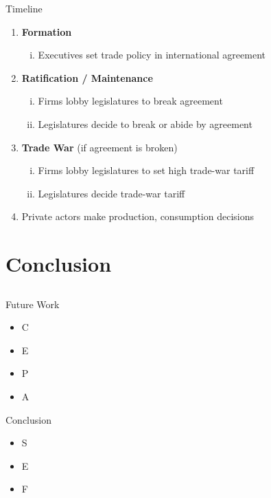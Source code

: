 \documentclass[handout]{beamer}
\begin{document}
\begin{frame}{Timeline}
\begin{enumerate}
	\item {\color{gray} \textbf{Formation}}
		\begin{enumerate}[i.]
			\item {\color{gray} Executives set trade policy in international agreement}
		\end{enumerate}
	\item \textbf{Ratification / Maintenance}
		\begin{enumerate}[i.]
			\item Firms lobby legislatures to break agreement
			\item {\color{gray} Legislatures decide to break or abide by agreement}
		\end{enumerate}
	\item {\color{gray} \textbf{Trade War} (if agreement is broken)}
		\begin{enumerate}[i.]
			\item {\color{gray} Firms lobby legislatures to set high trade-war tariff}
			\item {\color{gray} Legislatures decide trade-war tariff}
		\end{enumerate}
	\item {\color{gray} Private actors make production, consumption decisions}
\end{enumerate}
\end{frame}




\section{Conclusion}
\subsection{}
\begin{frame}{Future Work}
\begin{itemize}[<+->]
	\item C
	\item E
	\item P
	\item A
\end{itemize}
\end{frame}


\begin{frame}{Conclusion}
\begin{itemize}[<+->]
	\item S
	\item E
	\item F
\end{itemize}

\end{frame}
\end{document}
